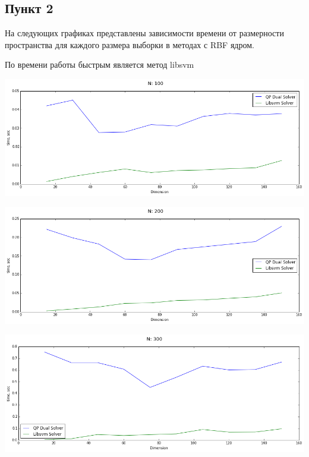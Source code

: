 \documentclass[12pt, a4paper]{article}
\begin{document}
		\newpage
		\subsection{Пункт 2}
			На следующих графиках представлены зависимости времени от размерности пространства для каждого размера выборки в методах с RBF ядром.

			По времени работы быстрым является метод libsvm

			\begin{center}
				\includegraphics[width=18cm]{2par_N100_one.png}
			\end{center}

			\begin{center}
				\includegraphics[width=18cm]{2par_N200_one.png}
			\end{center}

			\begin{center}
				\includegraphics[width=18cm]{2par_N300_one.png}
			\end{center}
\end{document}
